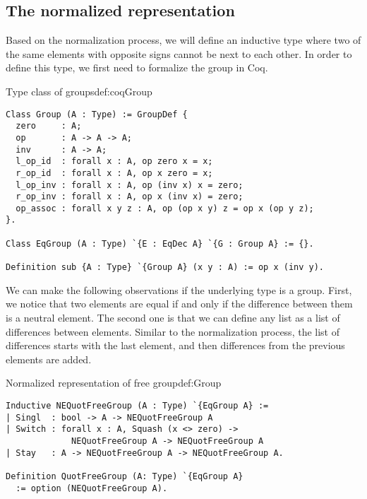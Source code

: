 \subsection{The normalized representation}
Based on the normalization process, we will define an inductive type where two of the same elements with opposite signs cannot be next to each other. In order to define this type, we first need to formalize the group in Coq.
\begin{defi}{Type class of groups}{def:coqGroup}
\begin{verbatim}
Class Group (A : Type) := GroupDef {
  zero     : A;
  op       : A -> A -> A;
  inv      : A -> A;
  l_op_id  : forall x : A, op zero x = x;
  r_op_id  : forall x : A, op x zero = x;
  l_op_inv : forall x : A, op (inv x) x = zero;
  r_op_inv : forall x : A, op x (inv x) = zero;
  op_assoc : forall x y z : A, op (op x y) z = op x (op y z);
}.

Class EqGroup (A : Type) `{E : EqDec A} `{G : Group A} := {}.

Definition sub {A : Type} `{Group A} (x y : A) := op x (inv y).
\end{verbatim}
\end{defi}
We can make the following observations if the underlying type is a group. First, we notice that two elements are equal if and only if the difference between them is a neutral element. The second one is that we can define any list as a list of differences between elements. Similar to the normalization process, the list of differences starts with the last element, and then differences from the previous elements are added.
\begin{defi}{Normalized representation of free group}{def:Group}
\begin{verbatim}
Inductive NEQuotFreeGroup (A : Type) `{EqGroup A} :=
| Singl  : bool -> A -> NEQuotFreeGroup A
| Switch : forall x : A, Squash (x <> zero) -> 
             NEQuotFreeGroup A -> NEQuotFreeGroup A
| Stay   : A -> NEQuotFreeGroup A -> NEQuotFreeGroup A.

Definition QuotFreeGroup (A: Type) `{EqGroup A} 
  := option (NEQuotFreeGroup A).
\end{verbatim}
\end{defi}
